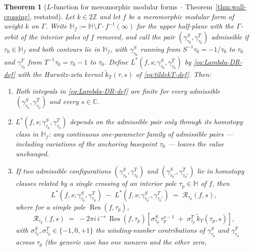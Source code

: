 \documentclass[11pt]{article}
\newtheorem{theorem}{Theorem}[section]
\numberwithin{equation}{section}  %
\newcommand{\HH}{\mathbb{H}}
\newcommand{\ZZ}{\mathbb{Z}}
\newcommand{\CC}{\mathbb{C}}
\DeclareMathOperator{\Res}{Res}
\begin{document}
\begin{theorem}[$L$-function for meromorphic modular forms -- Theorem~\ref{thm:wall-crossing}, restated]\label{thm:wall-crossing2}
Let $k \in 2\ZZ$ and let $f$ be a meromorphic modular form of weight
$k$ on $\Gamma$.  Write $\HH_f := \HH \setminus \Gamma\cdot
f^{-1}(\infty)$ for the upper half-plane with the $\Gamma$-orbit of
the interior poles of $f$ removed, and call the pair
$(\gamma^S_{\tau_0}, \gamma^T_{\tau_0})$ \emph{admissible} if
$\tau_0 \in \HH_f$ and both contours lie in $\HH_f$, with
$\gamma^S_{\tau_0}$ running from $S^{-1}\tau_0 = -1/\tau_0$ to $\tau_0$
and $\gamma^T_{\tau_0}$ from $T^{-1}\tau_0 = \tau_0 - 1$ to $\tau_0$.
Define $L^*(f, s; \gamma^S_{\tau_0}, \gamma^T_{\tau_0})$ by
\eqref{eq:Lambda-DR-def} with the Hurwitz-zeta kernel
$\widetilde{k}_T(\tau, s)$ of \eqref{eq:tildekT-def}.  Then:
\begin{enumerate}[label=(\alph*),leftmargin=2em]\itemsep0.25em
\item Both integrals in \eqref{eq:Lambda-DR-def} are finite for every
  admissible $(\gamma^S_{\tau_0}, \gamma^T_{\tau_0})$ and every $s \in
  \CC$.
\item $L^*(f, s; \gamma^S_{\tau_0}, \gamma^T_{\tau_0})$ depends on the
  admissible pair only through its homotopy class in $\HH_f$: any
  continuous one-parameter family of admissible pairs --- including
  variations of the anchoring basepoint $\tau_0$ --- leaves the value
  unchanged.
\item If two admissible configurations $(\gamma^S_{\tau_0},
  \gamma^T_{\tau_0})$ and $(\gamma^S_{\tau_0'}, \gamma^T_{\tau_0'})$ lie
  in homotopy classes related by a single crossing of an interior
  pole $\tau_p \in \HH$ of $f$, then
\begin{equation}\label{eq:wall-crossing-statement-restated}
  L^*(f, s; \gamma^S_{\tau_0}, \gamma^T_{\tau_0})
  \;-\;
  L^*(f, s; \gamma^S_{\tau_0'}, \gamma^T_{\tau_0'})
  \;=\; \mathcal{R}_{\tau_p}(f, s),
\end{equation}
where for a simple pole $\Res(f, \tau_p)$,
\begin{equation}\label{eq:residue-formula-restated}
  \mathcal{R}_{\tau_p}(f, s)
  \;=\; -2\pi i\,i^{-s}\,\Res(f, \tau_p)\!
  \left[\sigma^S_{\tau_p}\,\tau_p^{s - 1}
  \;+\; \sigma^T_{\tau_p}\,\widetilde{k}_T(\tau_p, s)\right],
\end{equation}
with $\sigma^S_{\tau_p}, \sigma^T_{\tau_p} \in \{-1, 0, +1\}$ the
winding-number contributions of $\gamma^S_{\tau_0}$ and $\gamma^T_{\tau_0}$ across
$\tau_p$ (the generic case has one nonzero and the other zero,

\end{enumerate}
\end{theorem}
\end{document}

